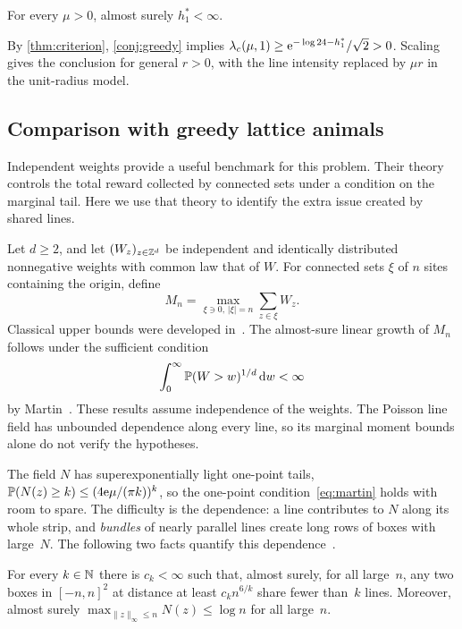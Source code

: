 \documentclass[11pt,letterpaper]{article}
\begin{document}
\begin{conjecture}
\label{conj:greedy}
For every $\mu>0$, almost surely $h_1^*<\infty$.
\end{conjecture}

By \cref{thm:criterion}, \cref{conj:greedy} implies $\lambda_c(\mu,1)\ge\mathrm{e}^{-\log24-h_1^*}/\sqrt2>0$. Scaling gives the conclusion for general $r>0$, with the line intensity replaced by $\mu r$ in the unit-radius model.

\subsection{Comparison with greedy lattice animals}

Independent weights provide a useful benchmark for this problem. Their theory controls the total reward collected by connected sets under a condition on the marginal tail. Here we use that theory to identify the extra issue created by shared lines.

Let $d\ge2$, and let $(W_z)_{z\in\mathbb Z^d}$ be independent and identically distributed nonnegative weights with common law that of $W$. For connected sets $\xi$ of $n$ sites containing the origin, define
\[
 M_n=\max_{\xi\ni0,\,|\xi|=n}\sum_{z\in\xi}W_z.
\]
Classical upper bounds were developed in~\cite{CGGK93}. The almost-sure linear growth of $M_n$ follows under the sufficient condition
\begin{equation}
\label{eq:martin}
  \int_0^\infty\mathbb P(W>w)^{1/d}\,\mathrm{d} w<\infty
\end{equation}
by Martin~\cite{Mar02}. These results assume independence of the weights. The Poisson line field has unbounded dependence along every line, so its marginal moment bounds alone do not verify the hypotheses.

The field $N$ has superexponentially light one-point tails, $\mathbb P(N(z)\ge k)\le(4\mathrm{e}\mu/(\pi k))^k$, so the one-point condition~\eqref{eq:martin} holds with room to spare. The difficulty is the dependence: a line contributes to $N$ along its whole strip, and \emph{bundles} of nearly parallel lines create long rows of boxes with large~$N$. The following two facts quantify this dependence~\cite[Lemma~7.1]{HJ26b}.

\begin{lemma}
\label{lem:shared}
For every $k\in\mathbb N$ there is $c_k<\infty$ such that, almost surely, for all large~$n$, any two boxes in $[-n,n]^2$ at distance at least $c_kn^{6/k}$ share fewer than~$k$ lines. Moreover, almost surely $\max_{\lVert z\rVert_\infty\le n}N(z)\le\log n$ for all large~$n$.
\end{lemma}
\end{document}
